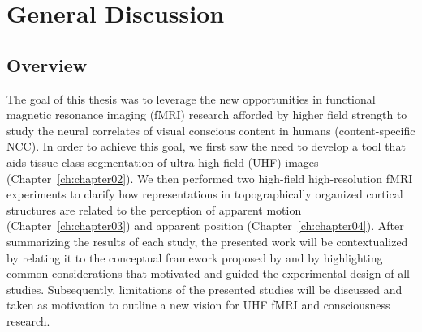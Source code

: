 \chapter{General Discussion}
\label{ch:chapter05}

\clearpage{\thispagestyle{empty}\cleardoublepage}

\section{Overview}
The goal of this thesis was to leverage the new opportunities in functional magnetic resonance imaging (fMRI) research afforded by higher field strength to study the neural correlates of visual conscious content in humans (content-specific NCC). In order to achieve this goal, we first saw the need to develop a tool that aids tissue class segmentation of ultra-high field (UHF) images (Chapter~\ref{ch:chapter02}). We then performed two high-field high-resolution fMRI experiments to clarify how representations in topographically organized cortical structures are related to the perception of apparent motion (Chapter~\ref{ch:chapter03}) and apparent position (Chapter~\ref{ch:chapter04}). After summarizing the results of each study, the presented work will be contextualized by relating it to the conceptual framework proposed by \cite{DeGraaf2012} and by highlighting common considerations that motivated and guided the experimental design of all studies. Subsequently, limitations of the presented studies will be discussed and taken as motivation to outline a new vision for UHF fMRI and consciousness research.

